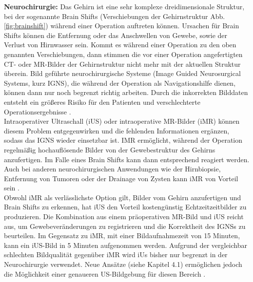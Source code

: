 \textbf{Neurochirurgie:}
Das Gehirn ist eine sehr komplexe dreidimensionale Struktur, bei der sogenannte Brain Shifts (Verschiebungen der Gehirnstruktur Abb. \ref{fig:brainshift}) während einer Operation auftreten können. Ursachen für Brain Shifts können die Entfernung oder das Anschwellen von Gewebe, sowie der Verlust von Hirnwasser sein. Kommt es während einer Operation zu den oben genannten Verschiebungen, dann stimmen die vor einer Operation angefertigten CT- oder MR-Bilder der Gehirnstruktur nicht mehr mit der aktuellen Struktur überein. Bild geführte neurochirurgische Systeme (Image Guided Neurosurgical Systems, kurz IGNS), die während der Operation als Navigationshilfe dienen, können dann nur noch begrenzt richtig arbeiten. Durch die inkorrekten Bilddaten entsteht ein größeres Risiko für den Patienten und verschlechterte Operationsergebnisse \cite{BrainShiftInTumorResection}.\\
Intraoperativer Ultraschall (iUS) oder intraoperative MR-Bilder (iMR) können diesem Problem entgegenwirken und die fehlenden Informationen ergänzen, sodass das IGNS wieder einsetzbar ist. IMR ermöglicht, während der Operation regelmäßig hochauflösende Bilder von der Gewebestruktur des Gehirns anzufertigen. Im Falle eines Brain Shifts kann dann entsprechend reagiert werden. Auch bei anderen neurochirurgischen Anwendungen wie der Hirnbiopsie, Entfernung von Tumoren oder der Drainage von Zysten kann iMR von Vorteil sein \cite{BrainShiftInTumorResection}.\\
Obwohl iMR als verlässlichste Option gilt, Bilder vom Gehirn anzufertigen und Brain Shifts zu erkennen, hat iUS den Vorteil kostengünstig Echtzeitzeitbilder zu produzieren. Die Kombination aus einem präoperativen MR-Bild und iUS reicht aus, um Gewebeveränderungen zu registrieren und die Korrektheit des IGNSs zu beurteilen. Im Gegensatz zu iMR, mit einer Bildaufnahmezeit von 15 Minuten, kann ein iUS-Bild in 5 Minuten aufgenommen werden. Aufgrund der vergleichbar schlechten Bildqualität gegenüber iMR wird iUs bisher nur begrenzt in der Neurochirurgie verwendet. Neue Ansätze (siehe Kapitel 4.1) ermöglichen jedoch die Möglichkeit einer genaueren US-Bildgebung für diesen Bereich \cite{BrainShiftInTumorResection}.

